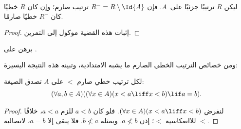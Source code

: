 \documentclass[../../../include/open-logic-section]{subfiles}
\begin{document}
\begin{prop}
ليكن $R$ ترتيبًا جزئيًا على~$A$. فإن $R^- = R \setminus \Id{A}$
ترتيب صارم؛ وإن كان $R$ خطيًا كان $R^-$ خطيًا صارمًا.
\end{prop}

\begin{proof}
إثبات هذه القضية موكول إلى التمرين.
\end{proof}

\begin{prob}
برهن على .
\end{prob}

ومن خصائص الترتيب الخطي الصارم ما يشبه الامتدادية، وتبينه هذه النتيجة اليسيرة:

\begin{prop}
لكل ترتيب خطي صارم $<$ على $A$ تصدق الصيغة:
\[
  (\forall a, b \in A)((\forall x \in A)(x < a \liff x < b) \lif a = b).
\]
\end{prop}

\begin{proof}
لنفرض $(\forall x \in A)(x < a \liff x < b)$. فلو كان $a < b$ للزم
$a < a$، خلافًا للاانعكاسية $<$؛ إذن $a \nless b$.
وبمثله $b \nless a$. فلا يبقى إلا $a = b$، لاتصالية $<$.
\end{proof}
\end{document}

